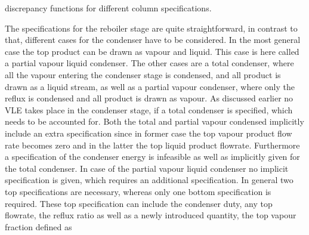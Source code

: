         \begin{table}
            \centering
            \footnotesize
            
            \caption{discrepancy functions for different column specifications.}
            \label{tab:discrepancy}
        \end{table}

        The specifications for the reboiler stage are quite straightforward, in contrast to that,
        different cases for the condenser have to be considered. In the most general case the
        top product can be drawn as vapour and liquid. This case is here called a partial vapour
        liquid condenser. The other cases are a total condenser, where all the vapour entering the
        condenser stage is condensed, and all product is drawn as a liquid stream, as well as
        a partial vapour condenser, where only the reflux is condensed and all product is drawn
        as vapour. As discussed earlier no VLE takes place in the condenser stage, if a total
        condenser is specified, which needs to be accounted for. Both the total and partial
        vapour condensed implicitly include an extra specification since in former case
        the top vapour product flow rate becomes zero and in the latter the top liquid product
        flowrate. Furthermore a specification of the condenser energy is infeasible as well as implicitly
        given for the total condenser. In case of the partial vapour liquid condenser no implicit
        specification is given, which requires an additional specification. In general two
        top specifications are necessary, whereas only one bottom specification is required.
        These top specification can include the condenser duty, any top flowrate, the reflux ratio
        as well as a newly introduced quantity, the top vapour fraction defined as


